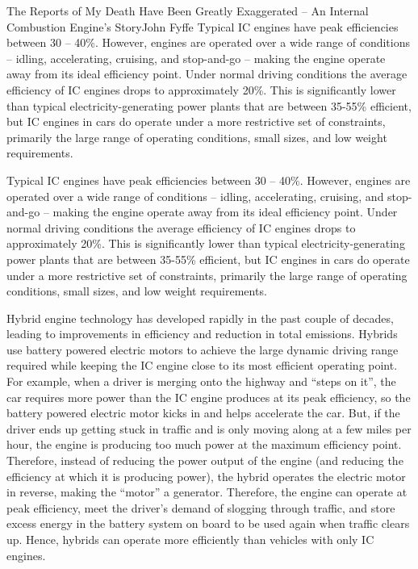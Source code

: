 \documentclass{papertex}
\begin{document}
\begin{news}{2}{The Reports of My Death Have Been Greatly Exaggerated -- An Internal Combustion Engine’s Story}{John Fyffe}{}{}
Typical IC engines have peak efficiencies between 30 – 40\%.  However, 
engines are operated over a wide range of conditions – idling, accelerating, 
cruising, and stop-and-go – making the engine operate away from its ideal 
efficiency point. Under normal driving conditions the average efficiency of 
IC engines drops to approximately 20\%.  This is significantly lower than 
typical electricity-generating power plants that are between 35-55\% 
efficient, but IC engines in cars do operate under a more restrictive set 
of constraints, primarily the large range of operating conditions, small 
sizes, and low weight requirements.

Typical IC engines have peak efficiencies between 30 – 40\%.  However, 
engines are operated over a wide range of conditions – idling, accelerating, 
cruising, and stop-and-go – making the engine operate away from its ideal 
efficiency point. Under normal driving conditions the average efficiency of 
IC engines drops to approximately 20\%.  This is significantly lower than 
typical electricity-generating power plants that are between 35-55\% 
efficient, but IC engines in cars do operate under a more restrictive set 
of constraints, primarily the large range of operating conditions, small 
sizes, and low weight requirements.

Hybrid engine technology has developed rapidly in the past couple of decades, 
leading to improvements in efficiency and reduction in total emissions.  
Hybrids use battery powered electric motors to achieve the large dynamic 
driving range required while keeping the IC engine close to its most 
efficient operating point.  For example, when a driver is merging onto the 
highway and “steps on it”, the car requires more power than the IC engine 
produces at its peak efficiency, so the battery powered electric motor kicks 
in and helps accelerate the car.  But, if the driver ends up getting stuck 
in traffic and is only moving along at a few miles per hour, the engine is 
producing too much power at the maximum efficiency point.  Therefore, 
instead of reducing the power output of the engine (and reducing the 
efficiency at which it is producing power), the hybrid operates the electric 
motor in reverse, making the “motor” a generator.  Therefore, the engine can 
operate at peak efficiency, meet the driver’s demand of slogging through 
traffic, and store excess energy in the battery system on board to be used 
again when traffic clears up. Hence, hybrids can operate more efficiently 
than vehicles with only IC engines.


\end{news}
\end{document}
